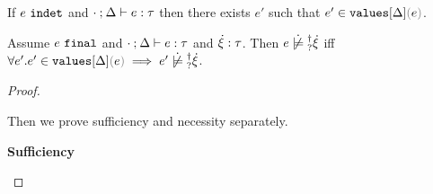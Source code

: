 \begin{lemma}
  \label{lem:invalues-derivable}
  If $e ~\mathtt{indet}$ and $\cdot \mathbin{;} \Delta \vdash e : \tau$ then there exists $e'$ such that $\inValues{e'}{\Delta}{e}$.
\end{lemma}

\begin{lemma}
  \label{lem:complete-not-satormay}
  Assume $e ~\mathtt{final}$ and $\cdot \mathbin{;} \Delta \vdash e : \tau$ and
  $\dot{\xi} : \tau$. Then $\cnotsatisfyormay{e}{\hxi}$ iff $\forall
  e'.\inValues{e'}{\Delta}{e} \implies \cnotsatisfyormay{e'}{\hxi}$.
  
\end{lemma}
\begin{proof}
  \begin{pfsteps}
  \item {}  
  \item {}  
  \item \ctyp{\hxi}{\tau}  
  \end{pfsteps}
  Then we prove sufficiency and necessity separately.

  \textbf{Sufficiency}
  \begin{pfsteps}
  \item {}  
  \end{pfsteps}


\end{proof}
